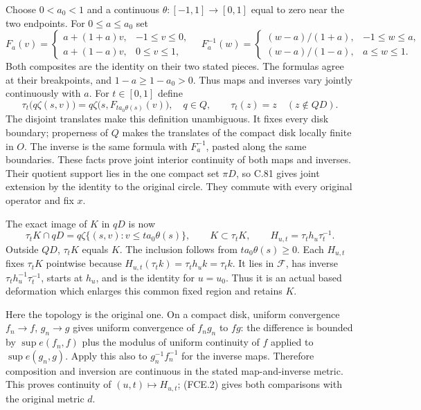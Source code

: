 \documentclass[11pt,a4paper]{article}
\begin{document}
Choose $0<a_0<1$ and a continuous
$\theta:[-1,1]\to[0,1]$ equal to zero near the two endpoints.
For $0\leq a\leq a_0$ set
\[
 F_a(v)=
 \begin{cases}a+(1+a)v,&-1\leq v\leq0,\\
               a+(1-a)v,&0\leq v\leq1,
 \end{cases}
 \quad
 F_a^{-1}(w)=
 \begin{cases}(w-a)/(1+a),&-1\leq w\leq a,\\
               (w-a)/(1-a),&a\leq w\leq1.
 \end{cases}                                                   \tag{FCE.7}
\]
Both composites are the identity on their two stated pieces.
The formulas agree at their breakpoints, and $1-a\geq1-a_0>0$.
Thus maps and inverses vary jointly continuously with $a$.
For $t\in[0,1]$ define
\[
 \tau_t\bigl(q\zeta(s,v)\bigr)
       =q\zeta\bigl(s,F_{t a_0\theta(s)}(v)\bigr),
       \quad q\in Q,
 \qquad
 \tau_t(z)=z\quad(z\notin QD).
                                                               \tag{FCE.8}
\]
The disjoint translates make this definition unambiguous.
It fixes every disk boundary; properness of $Q$ makes the
translates of the compact disk locally finite in $O$. The
inverse is the same formula with $F_a^{-1}$, pasted along
the same boundaries. These facts prove joint interior
continuity of both maps and inverses. Their quotient support
lies in the one compact set $\pi D$, so C.81 gives joint
extension by the identity to the original circle. They
commute with every original operator and fix $x$.

The exact image of $K$ in $qD$ is now
\[
 \tau_tK\cap qD
   =q\zeta\{(s,v):v\leq t a_0\theta(s)\},\qquad
 K\subset\tau_tK,
 \qquad
 H_{u,t}=\tau_t h_u\tau_t^{-1}.
                                                               \tag{FCE.9}
\]
Outside $QD$, $\tau_tK$ equals $K$. The inclusion follows
from $t a_0\theta(s)\geq0$. Each $H_{u,t}$ fixes
$\tau_tK$ pointwise because
$H_{u,t}(\tau_tk)=\tau_th_uk=\tau_tk$.
It lies in $\mathscr F$, has inverse
$\tau_t h_u^{-1}\tau_t^{-1}$, starts at $h_u$, and is the
identity for $u=u_0$. Thus it is an actual based deformation
which enlarges this common fixed region and retains $K$.

Here the topology is the original one. On a compact disk,
uniform convergence $f_n\to f$, $g_n\to g$ gives uniform
convergence of $f_ng_n$ to $fg$: the difference is bounded
by $\sup e(f_n,f)$ plus the modulus of uniform continuity
of $f$ applied to $\sup e(g_n,g)$. Apply this also to
$g_n^{-1}f_n^{-1}$ for the inverse maps. Therefore composition
and inversion are continuous in the stated map-and-inverse
metric. This proves continuity of $(u,t)\mapsto H_{u,t}$;
(FCE.2) gives both comparisons with the original metric $d$.
\end{document}
